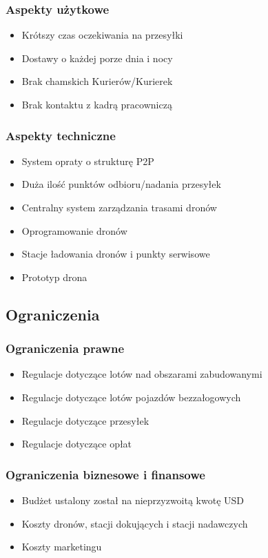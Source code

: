\documentclass[12pt]{article}
\begin{document}
\subsubsection{Aspekty użytkowe}
\begin{itemize}
\item Krótszy czas oczekiwania na przesyłki
\item Dostawy o każdej porze dnia i nocy
\item Brak chamskich Kurierów/Kurierek
\item Brak kontaktu z kadrą pracowniczą
\end{itemize}

\subsubsection{Aspekty techniczne}
\begin{itemize}
\item System opraty o strukturę P2P
\item Duża ilość punktów odbioru/nadania przesyłek
\item Centralny system zarządzania trasami dronów
\item Oprogramowanie dronów
\item Stacje ładowania dronów i punkty serwisowe
\item Prototyp drona
\end{itemize}

\subsection{Ograniczenia}
\subsubsection{Ograniczenia prawne}
\begin{itemize}
\item Regulacje dotyczące lotów nad obszarami zabudowanymi
\item Regulacje dotyczące lotów pojazdów bezzałogowych
\item Regulacje dotyczące przesyłek
\item Regulacje dotyczące opłat
\end{itemize}
\subsubsection{Ograniczenia biznesowe i finansowe}
\begin{itemize}
\item Budżet ustalony został na nieprzyzwoitą kwotę USD
\item Koszty dronów, stacji dokujących i stacji nadawczych
\item Koszty marketingu

\end{itemize}
\end{document}
